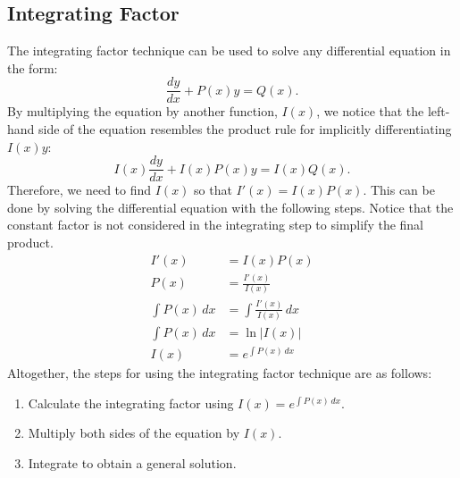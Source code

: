 \documentclass[12pt]{article}
\begin{document}
\subsection{Integrating Factor}
The integrating factor technique can be used to solve any differential equation in the form:
\[ \frac{dy}{dx} + P(x) y = Q(x). \]
By multiplying the equation by another function, $I(x)$, we notice that the left-hand side of the equation resembles the product rule for implicitly differentiating $I(x) y$:
\[ I(x) \frac{dy}{dx} + I(x) P(x)y = I(x) Q(x). \]
Therefore, we need to find $I(x)$ so that $I'(x) = I(x) P(x)$. This can be done by solving the differential equation with the following steps. Notice that the constant factor is not considered in the integrating step to simplify the final product.
\begin{align*}
	I'(x) &= I(x) P(x) \\
	P(x) &= \frac{I'(x)}{I(x)} \\[5pt]
	\int P(x) \, dx &= \int \frac{I'(x)}{I(x)} \, dx \\[5pt]
	\int P(x) \, dx &= \ln |I(x)| \\[5pt]
	I(x) &= e^{\int P(x) \, dx}
\end{align*}
Altogether, the steps for using the integrating factor technique are as follows:
\begin{enumerate}
	\item Calculate the integrating factor using $I(x) = e^{\int P(x) \, dx}$.
	\item Multiply both sides of the equation by $I(x)$.
	\item Integrate to obtain a general solution.
\end{enumerate}
\end{document}
